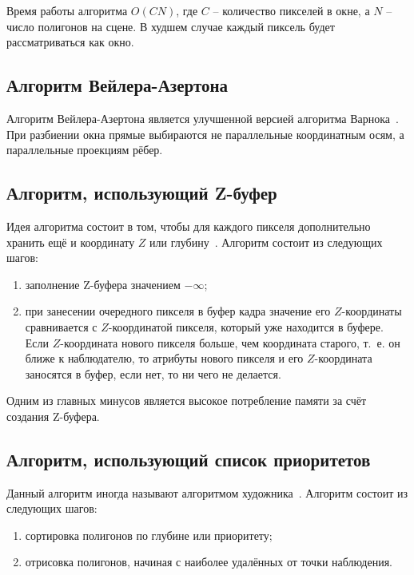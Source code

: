 Время работы алгоритма $O(CN)$, где $C$ -- количество пикселей в окне, а $N$ -- число полигонов на сцене. В худшем случае каждый пиксель будет рассматриваться как окно.

\subsection{Алгоритм Вейлера-Азертона}

Алгоритм Вейлера-Азертона является улучшенной версией алгоритма Варнока~\cite{cannon}. При разбиении окна прямые выбираются не параллельные координатным осям, а параллельные проекциям рёбер.

\subsection{Алгоритм, использующий Z-буфер}

Идея алгоритма состоит в том, чтобы для каждого пикселя дополнительно хранить ещё и координату $Z$ или глубину~\cite{bands}. Алгоритм состоит из следующих шагов:

\begin{enumerate}
	\item заполнение Z-буфера значением $-\infty$;
	\item при занесении очередного пикселя в буфер кадра значение его $Z$-координаты сравнивается с $Z$-координатой пикселя, который уже находится в буфере. Если $Z$-координата нового пикселя больше, чем координата старого, т.~е. он ближе к наблюдателю, то атрибуты нового пикселя и его $Z$-координата заносятся в буфер, если нет, то ни чего не делается. 
\end{enumerate}

Одним из главных минусов является высокое потребление памяти за счёт создания Z-буфера.

\subsection{Алгоритм, использующий список приоритетов}

Данный алгоритм иногда называют алгоритмом художника~\cite{parshina}. Алгоритм состоит из следующих шагов:

\begin{enumerate}
	\item сортировка полигонов по глубине или приоритету;
	\item отрисовка полигонов, начиная с наиболее удалённых от точки наблюдения. 
\end{enumerate}

